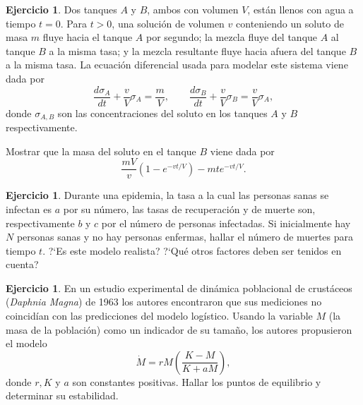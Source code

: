 \documentclass[12pt, a4paper]{amsbook}
\theoremstyle{remark}
\theoremstyle{definition}
\newtheorem{ejer}[teo]{Ejercicio}
\numberwithin{section}{chapter}
\numberwithin{subsection}{section}
\numberwithin{equation}{section}
\numberwithin{figure}{chapter}
\begin{document}
\begin{ejer}
Dos tanques $A$ y $B$, ambos con volumen $V$, están llenos con agua a tiempo $t=0$. Para $t > 0$, una solución de volumen $v$ conteniendo un soluto de masa $m$ fluye hacia el tanque $A$ por segundo; la mezcla fluye del tanque $A$ al tanque $B$ a la misma tasa; y la mezcla resultante fluye hacia afuera del tanque $B$ a la misma tasa. La ecuación diferencial usada para modelar este sistema viene dada por
$$
\frac{d\sigma_A}{dt} + \frac{v}{V}\sigma_A = \frac{m}{V},\qquad \frac{d\sigma_B}{dt} + \frac{v}{V} \sigma_B = \frac{v}{V}\sigma_A,
$$
donde $\sigma_{A,B}$ son las concentraciones del soluto en los tanques $A$ y $B$ respectivamente.

Mostrar que la masa del soluto en el tanque $B$ viene dada por
$$
\frac{mV}{v}\left(1 - e^{-vt/V}\right) - m t e^{-vt/V}.
$$
\end{ejer}

\begin{ejer}
Durante una epidemia, la tasa a la cual las personas sanas se infectan es $a$ por su número, las tasas de recuperación y de muerte son, respectivamente $b$ y $c$ por el número de personas infectadas. Si inicialmente hay $N$ personas sanas y no hay personas enfermas, hallar el número de muertes para tiempo $t$. ?`Es este modelo realista? ?`Qué otros factores deben ser tenidos en cuenta?
\end{ejer}



\begin{ejer}
En un estudio experimental de dinámica poblacional de crustáceos ({\em Daphnia Magna}) de 1963 los autores encontraron que sus mediciones no coincidían con las predicciones del modelo logístico. Usando la variable $M$ (la masa de la población) como un indicador de su tamaño, los autores propusieron el modelo
$$
\dot M = r M \left(\frac{K-M}{K+aM}\right),
$$
donde $r, K$ y $a$ son constantes positivas. Hallar los puntos de equilibrio y determinar su estabilidad.
\end{ejer}
\end{document}
